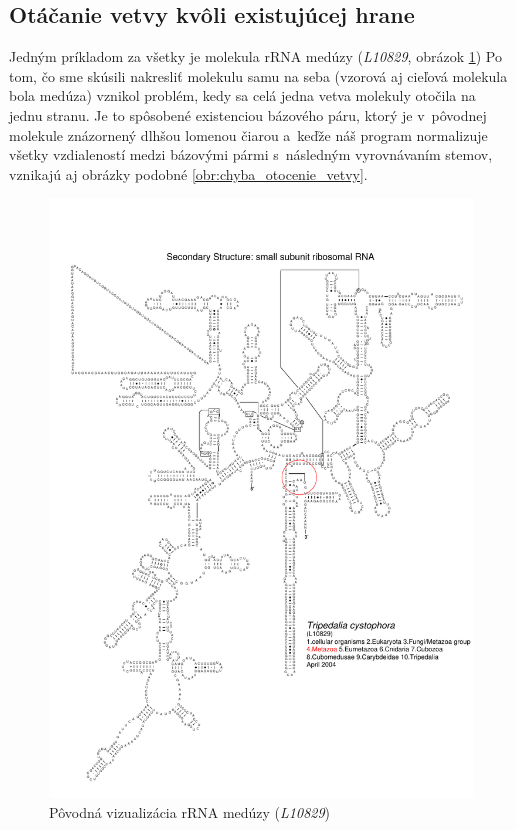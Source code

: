 \subsection{Otáčanie vetvy kvôli existujúcej hrane}

Jedným príkladom za všetky je molekula rRNA medúzy (\textit{L10829},
obrázok \ref{obr:chyba_otocenie_vetvy_povodna})
Po tom, čo sme skúsili nakresliť molekulu samu na seba
(vzorová aj cieľová molekula bola medúza) vznikol problém,
kedy sa celá jedna vetva molekuly otočila na jednu stranu.
Je to spôsobené existenciou bázového páru,
ktorý je v~pôvodnej molekule znázornený dlhšou lomenou čiarou
a~keďže náš program normalizuje všetky vzdialeností medzi bázovými
pármi s~následným vyrovnávaním stemov, vznikajú aj obrázky
podobné \ref{obr:chyba_otocenie_vetvy}.

\begin{figure}
  \includegraphics[width=1\textwidth]{../img/chyby/tripedalia_cystophora}
  \caption{Pôvodná vizualizácia rRNA medúzy (\textit{L10829})}
  \label{obr:chyba_otocenie_vetvy_povodna}
\end{figure}

